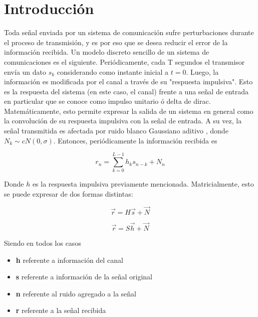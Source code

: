 \section{Introducci\'on}
Toda se\~nal enviada por un sistema de comunicaci\'on sufre perturbaciones durante el proceso de transmisi\'on, y es por eso que se desea reducir el error de la informaci\'on recibida.
Un modelo discreto sencillo de un sistema de comunicaciones es el siguiente. Peri\'odicamente, cada T segundos el transmisor env\'ia un dato $s_k$ considerando como instante inicial a $t = 0$. Luego, la informaci\'on es modificada por el canal a través de su "respuesta impulsiva". Esto es la respuesta del sistema (en este caso, el canal) frente a una se\~nal de entrada en particular que se conoce como impulso unitario \'o delta de dirac. Matem\'aticamente, esto permite expresar la salida de un sistema en general como la convoluci\'on de su respuesta impulsiva con la se\~nal de entrada.
A su vez, la señal transmitida es afectada por ruido blanco Gaussiano aditivo , donde $N_k \sim cN(0,\sigma)$. Entonces, peri\'odicamente la informaci\'on recibida es 

\begin{equation*} 
r_n = \sum_{k=0}^{L-1} h_k s_{n-k} + N_n 
\end{equation*} 

Donde $h$  es la respuesta impulsiva previamente mencionada. Matricialmente, esto se puede expresar de dos formas distintas:

\begin{equation}  
\vec{r} = H \vec{s} + \vec{N} 
\label{eq: r=hs+n}
\end{equation} 

\begin{equation} 
\vec{r} = S \vec{h} + \vec{N} 
\label{eq: r=sh+n}
\end{equation} 

Siendo en todos los casos 
\begin{itemize}
	\item \textbf{h} referente a información del canal
	\item \textbf{s} referente a información de la señal original
	\item \textbf{n} referente al ruido agregado a la señal
	\item \textbf{r} referente a la señal recibida
\end{itemize}
	
